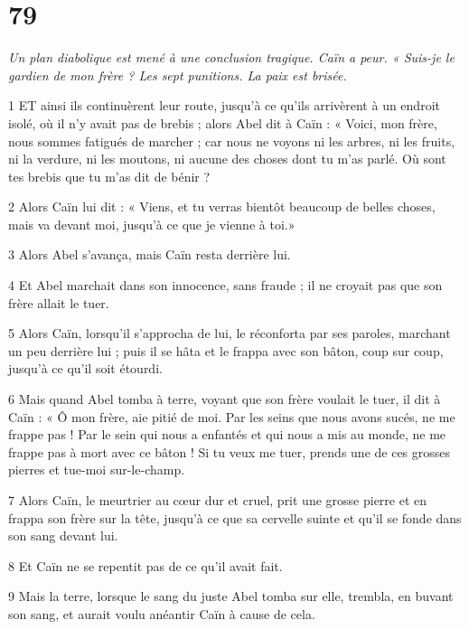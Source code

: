 \chapter{79}

\par \textit{Un plan diabolique est mené à une conclusion tragique. Caïn a peur. « Suis-je le gardien de mon frère ? Les sept punitions. La paix est brisée.}

\par 1 ET ainsi ils continuèrent leur route, jusqu'à ce qu'ils arrivèrent à un endroit isolé, où il n'y avait pas de brebis ; alors Abel dit à Caïn : « Voici, mon frère, nous sommes fatigués de marcher ; car nous ne voyons ni les arbres, ni les fruits, ni la verdure, ni les moutons, ni aucune des choses dont tu m'as parlé. Où sont tes brebis que tu m’as dit de bénir ?

\par 2 Alors Caïn lui dit : « Viens, et tu verras bientôt beaucoup de belles choses, mais va devant moi, jusqu'à ce que je vienne à toi.»

\par 3 Alors Abel s'avança, mais Caïn resta derrière lui.

\par 4 Et Abel marchait dans son innocence, sans fraude ; il ne croyait pas que son frère allait le tuer.

\par 5 Alors Caïn, lorsqu'il s'approcha de lui, le réconforta par ses paroles, marchant un peu derrière lui ; puis il se hâta et le frappa avec son bâton, coup sur coup, jusqu'à ce qu'il soit étourdi.

\par 6 Mais quand Abel tomba à terre, voyant que son frère voulait le tuer, il dit à Caïn : « Ô mon frère, aie pitié de moi. Par les seins que nous avons sucés, ne me frappe pas ! Par le sein qui nous a enfantés et qui nous a mis au monde, ne me frappe pas à mort avec ce bâton ! Si tu veux me tuer, prends une de ces grosses pierres et tue-moi sur-le-champ.

\par 7 Alors Caïn, le meurtrier au cœur dur et cruel, prit une grosse pierre et en frappa son frère sur la tête, jusqu'à ce que sa cervelle suinte et qu'il se fonde dans son sang devant lui.

\par 8 Et Caïn ne se repentit pas de ce qu'il avait fait.

\par 9 Mais la terre, lorsque le sang du juste Abel tomba sur elle, trembla, en buvant son sang, et aurait voulu anéantir Caïn à cause de cela.

